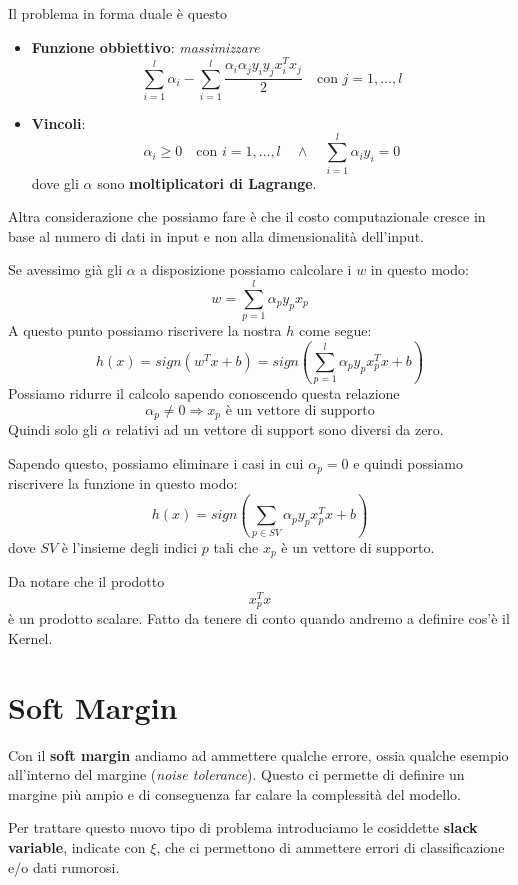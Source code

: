 Il problema in forma duale \`e questo
\begin{itemize}
	\item \textbf{Funzione obbiettivo}: \emph{massimizzare}
	      \[
		      \sum_{i=1}^l \alpha_i - \sum_{i=1}^l \frac{\alpha_i \alpha_j y_i y_j x_i^T x_j}{2}
		      \quad
		      \text{con } j = 1, \dots, l
	      \]
	\item \textbf{Vincoli}:
	      \[
		      \alpha_i \geq 0 \quad \text{con } i = 1, \dots, l
		      \quad \wedge \quad
		      \sum_{i=1}^l \alpha_i y_i = 0
	      \]
	      dove gli $\alpha$ sono \textbf{moltiplicatori di Lagrange}.
\end{itemize}
Altra considerazione che possiamo fare \`e che il costo computazionale cresce in base al numero di dati in input e non
alla dimensionalit\`a dell'input.

Se avessimo gi\`a gli $\alpha$ a disposizione possiamo calcolare i $w$ in questo modo:
\[ w = \sum_{p=1}^l \alpha_p y_p x_p \]
A questo punto possiamo riscrivere la nostra $h$ come segue:
\[ h(x) = sign(w^T x + b) = sign \left( \sum_{p=1}^l \alpha_p y_p x_p^T x + b \right) \]
Possiamo ridurre il calcolo sapendo conoscendo questa relazione
\[ \alpha_p \neq 0 \Rightarrow x_p \text{ \`e un vettore di supporto} \]
Quindi solo gli $\alpha$ relativi ad un vettore di support sono diversi da zero.

Sapendo questo, possiamo eliminare i casi in cui $\alpha_p = 0$ e quindi possiamo riscrivere la funzione in questo modo:
\[ h(x) = sign \left( \sum_{p \in SV} \alpha_p y_p x_p^T x + b \right) \]
dove $SV$ \`e l'insieme degli indici $p$ tali che $x_p$ \`e un vettore di supporto.

Da notare che il prodotto
\[ x_p^T x \]
\`e un prodotto scalare. Fatto da tenere di conto quando andremo a definire cos'\`e il Kernel.

\section{Soft Margin}
Con il \textbf{soft margin} andiamo ad ammettere qualche errore, ossia qualche esempio all'interno del margine
(\emph{noise tolerance}). Questo ci permette di definire un margine pi\`u ampio e di conseguenza far calare la complessit\`a
del modello.

Per trattare questo nuovo tipo di problema introduciamo le cosiddette \textbf{slack variable}, indicate con $\xi$, che ci
permettono di ammettere errori di classificazione e/o dati rumorosi.

